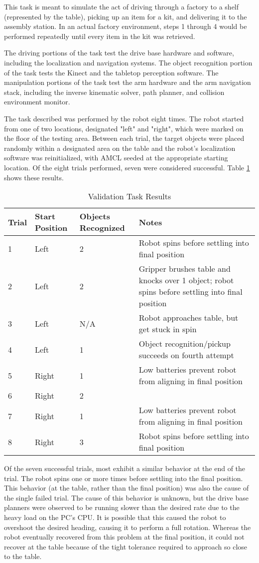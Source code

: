 \documentclass[]{cwru} %
\begin{document}
This task is meant to simulate the act of driving through a factory to a
shelf (represented by the table), picking up an item for a kit, and
delivering it to the assembly station. In an actual factory environment,
steps 1 through 4 would be performed repeatedly until every item in the
kit was retrieved.

The driving portions of the task test the drive base hardware and
software, including the localization and navigation systems. The object
recognition portion of the task tests the Kinect and the tabletop
perception software. The manipulation portions of the task test the arm
hardware and the arm navigation stack, including the inverse kinematic
solver, path planner, and collision environment monitor.

The task described was performed by the robot eight times. The robot
started from one of two locations, designated "left" and "right", which
were marked on the floor of the testing area. Between each trial, the
target objects were placed randomly within a designated area on the
table and the robot's localization software was reinitialized, with AMCL
seeded at the appropriate starting location. Of the eight trials
performed, seven were considered successful. Table \ref{table:validation} shows these
results.

\begin{longtable}[c]{@{}lp{3cm}p{2.5cm}p{7.5cm}@{}}
\caption{Validation Task Results}
\label{table:validation}\tabularnewline
\endfirsthead
\toprule
\textbf{Trial} & \textbf{Start
Position} & \textbf{Objects Recognized} & \textbf{Notes}\tabularnewline
\midrule
\endhead
1 & Left & 2 & Robot spins before settling into final
position\tabularnewline
2 & Left & 2 & Gripper brushes table and knocks over 1 object; robot
spins before settling into final position\tabularnewline
3 & Left & N/A & Robot approaches table, but get stuck in
spin\tabularnewline
4 & Left & 1 & Object recognition/pickup succeeds on fourth
attempt\tabularnewline
5 & Right & 1 & Low batteries prevent robot from aligning in final
position\tabularnewline
6 & Right & 2 &\tabularnewline
7 & Right & 1 & Low batteries prevent robot from aligning in final
position\tabularnewline
8 & Right & 3 & Robot spins before settling into final
position\tabularnewline
\bottomrule
\end{longtable}

Of the seven successful trials, most exhibit a similar behavior at the
end of the trial. The robot spins one or more times before settling into
the final position. This behavior (at the table, rather than the final
position) was also the cause of the single failed trial. The cause of
this behavior is unknown, but the drive base planners were observed to
be running slower than the desired rate due to the heavy load on the
PC's CPU. It is possible that this caused the robot to overshoot the
desired heading, causing it to perform a full rotation. Whereas the
robot eventually recovered from this problem at the final position, it
could not recover at the table because of the tight tolerance required
to approach so close to the table.
\end{document}
